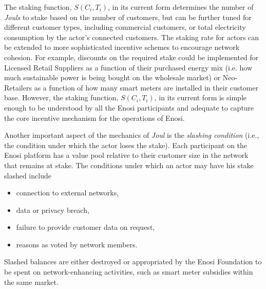 \documentclass[a4paper,12pt,reqno]{amsart}
\theoremstyle{definition}
\begin{document}
The staking function, $S(C_i,T_i)$, in its current form determines the number of \textit{Jouls} to stake based on the number of customers, but can be further tuned for different customer types, including commercial customers, or total electricity consumption by the actor's connected customers. The staking rate for actors can be extended to more sophisticated incentive schemes to encourage network cohesion. For example, discounts on the required stake could be implemented for Licensed Retail Suppliers as a function of their purchased energy mix (i.e. how much sustainable power is being bought on the wholesale market) or Neo-Retailers as a function of how many smart meters are installed in their customer base. However, the staking function, $S(C_i,T_i)$, in its current form is simple enough to be understood by all the Enosi participants and adequate to capture the core incentive mechanism for the operations of Enosi.

Another important aspect of the mechanics of \textit{Joul} is the \textit{slashing condition} (i.e., the condition under which the actor loses the stake). Each participant on the Enosi platform has a value pool relative to their customer size in the network that remains at stake. The conditions under which an actor may have his stake slashed include 
\begin{itemize}
\item{connection to external networks,}
\item{data or privacy breach,}
\item{failure to provide customer data on request,}
\item{reasons as voted by network members.}
\end{itemize}
Slashed balances are either destroyed or appropriated by the Enosi Foundation to be spent on network-enhancing activities, such as smart meter subsidies within the same market.
\end{document}
